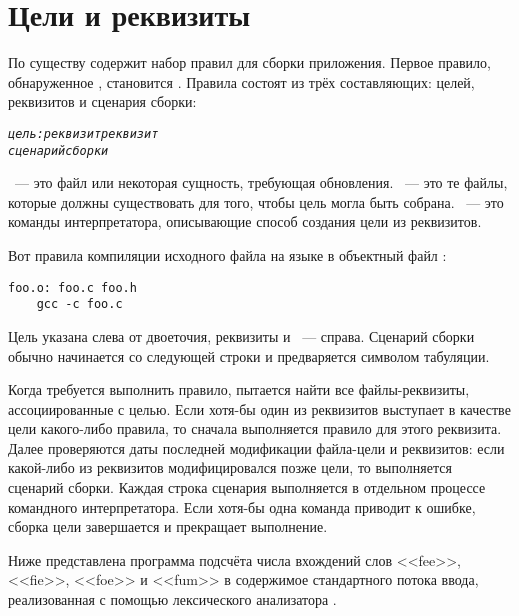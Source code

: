 \section{Цели и реквизиты}
По существу \Makefile{} содержит набор правил для сборки приложения.
Первое правило, обнаруженное \GNUmake{}, становится . Правила состоят из трёх составляющих: целей, реквизитов
и сценария сборки:

{\footnotesize
\begin{alltt}
\emph{цель: реквизит реквизит
    сценарий сборки
}
\end{alltt}
}

~--- это файл или некоторая сущность, требующая
обновления.
~--- это те файлы, которые должны существовать для
того, чтобы цель могла быть собрана.
~--- это команды интерпретатора, описывающие
способ создания цели из реквизитов.

Вот правила компиляции исходного файла на языке \Clang{}
 в объектный файл :

{\footnotesize
\begin{verbatim}
foo.o: foo.c foo.h
    gcc -c foo.c
\end{verbatim}
}

Цель  указана слева от двоеточия, реквизиты
 и ~--- справа. Сценарий сборки обычно
начинается со следующей строки и предваряется символом табуляции.

Когда требуется выполнить правило, \GNUmake{} пытается найти все
файлы-реквизиты, ассоциированные с целью. Если хотя\hyp{}бы один из
реквизитов выступает в качестве цели какого\hyp{}либо правила, то
сначала выполняется правило для этого реквизита. Далее проверяются
даты последней модификации файла\hyp{}цели и реквизитов: если
какой-либо из реквизитов модифицировался позже цели, то выполняется
сценарий сборки. Каждая строка сценария выполняется в отдельном
процессе командного интерпретатора. Если хотя\hyp{}бы одна команда
приводит к ошибке, сборка цели завершается и \GNUmake{} прекращает
выполнение.

Ниже представлена программа подсчёта числа вхождений слов <<fee>>,
<<fie>>, <<foe>> и <<fum>> в содержимое стандартного потока ввода,
реализованная с помощью лексического анализатора .

